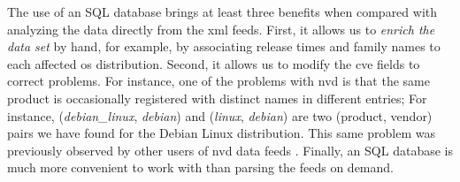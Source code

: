



The use of an SQL database brings at least three benefits when compared with analyzing the data directly from the \gls{xml} feeds.
First, it allows us to \emph{enrich the data set} by hand, for example, by associating release times and family names to each affected \gls{os} distribution.
Second, it allows us to modify the \gls{cve} fields to correct problems.
For instance, one of the problems with \gls{nvd} is that the same product is occasionally registered with distinct names in different entries;
For instance, (\textit{debian\_linux}, \textit{debian}) and (\textit{linux}, \textit{debian}) are two (product, vendor) pairs we have found for the Debian Linux distribution.
This same problem was previously observed by other users of \gls{nvd} data feeds \cite{cvedetails}.
Finally, an SQL database is much more convenient to work with than parsing the feeds on demand.

